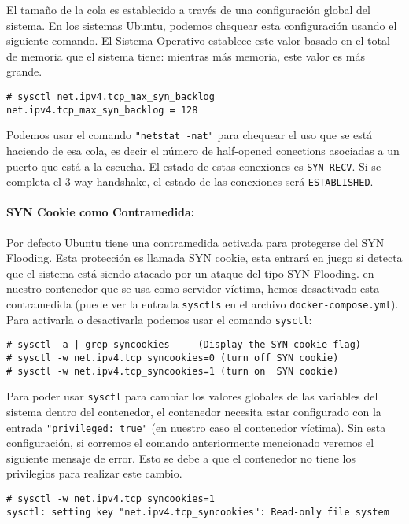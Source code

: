 El tamaño de la cola es establecido a través de una configuración global del sistema. En los sistemas Ubuntu, podemos chequear esta configuración usando el siguiente comando. El Sistema Operativo establece este valor basado en el total de memoria que el sistema tiene: mientras más memoria, este valor es más grande.

\begin{lstlisting}
# sysctl net.ipv4.tcp_max_syn_backlog
net.ipv4.tcp_max_syn_backlog = 128
\end{lstlisting}

Podemos usar el comando \texttt{"netstat -nat"} para chequear el uso que se está haciendo de esa cola, es decir el número de half-opened conections asociadas a un puerto que está a la escucha.
El estado de estas conexiones es \texttt {SYN-RECV}. Si se completa el 3-way handshake, el estado de las conexiones será {\tt ESTABLISHED}.


\paragraph{SYN Cookie como Contramedida:}
Por defecto Ubuntu tiene una contramedida activada para protegerse del SYN Flooding. Esta protección es llamada SYN cookie, esta entrará en juego si detecta que el sistema está siendo atacado por un ataque del tipo SYN Flooding.
en nuestro contenedor que se usa como servidor víctima, hemos desactivado esta contramedida (puede ver la entrada \texttt{sysctls} en el archivo \texttt{docker-compose.yml}).
Para activarla o desactivarla podemos usar el comando \texttt{sysctl}:

\begin{lstlisting}
# sysctl -a | grep syncookies     (Display the SYN cookie flag) 
# sysctl -w net.ipv4.tcp_syncookies=0 (turn off SYN cookie)
# sysctl -w net.ipv4.tcp_syncookies=1 (turn on  SYN cookie)
\end{lstlisting}

Para poder usar \texttt{sysctl} para cambiar los valores globales de las variables del sistema dentro del contenedor, el contenedor necesita estar configurado con la entrada \texttt{"privileged: true"} (en nuestro caso el contenedor víctima).
Sin esta configuración, si corremos el comando anteriormente mencionado veremos el siguiente mensaje de error. Esto se debe a que el contenedor no tiene los privilegios para realizar este cambio.

\begin{lstlisting}
# sysctl -w net.ipv4.tcp_syncookies=1
sysctl: setting key "net.ipv4.tcp_syncookies": Read-only file system
\end{lstlisting}



